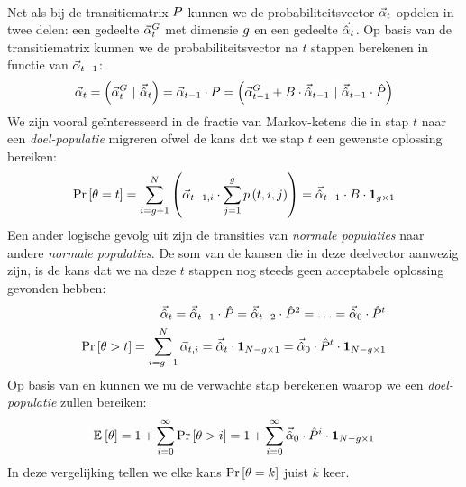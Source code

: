 \paragraph{}
Net als bij de transitiematrix $P$ kunnen we de probabiliteitsvector $\vec{\alpha}_{t}$ opdelen in twee delen: een gedeelte $\vec{\alpha}^G_{t}$ met dimensie $g$ en een gedeelte $\vec{\hat{\alpha}}_{t}$. Op basis van de transitiematrix kunnen we de probabiliteitsvector na $t$ stappen berekenen in functie van $\vec{\alpha}_{t-1}$:
\begin{equation}
\probdistmeta{t}=\brak{\probdistgoalmeta{t}\ |\ \probdistnormmeta{t}}=\probdistmeta{t-1}\cdot\transmat=\brak{\probdistgoalmeta{t-1}+\bridgemat\cdot\probdistnormmeta{t-1}\ |\ \probdistnormmeta{t-1}\cdot\removmat}
\eqnlab{oneStepTransition}
\end{equation}
We zijn vooral ge\"interesseerd in de fractie van Markov-ketens die in stap $t$ naar een \emph{doel-populatie} migreren ofwel de kans dat we stap $t$ een gewenste oplossing bereiken:
\begin{equation}
\Prob{\hittime=t}=\displaystyle\sum_{i=\ntarpop+1}^{N}\brak{\probdistmeta{t-1,i}\cdot\displaystyle\sum_{j=1}^{\ntarpop}\fun{p}{t,i,j}}=\probdistnormmeta{t-1}\cdot \bridgemat\cdot\onematrix[\ntarpop\times 1]
\eqnlab{exhaust}
\end{equation}
Een ander logische gevolg uit  zijn de transities van \emph{normale populaties} naar andere \emph{normale populaties}. De som van de kansen die in deze deelvector aanwezig zijn, is de kans dat we na deze $t$ stappen nog steeds geen acceptabele oplossing gevonden hebben:
\begin{eqnarray}
\probdistnormmeta{t}=\probdistnormmeta{t-1}\cdot\removmat=\probdistnormmeta{t-2}\cdot\removmat^2=\ldots=\probdistnormmeta{0}\cdot\removmat^t\eqnlab{remainder}\\
\Prob{\hittime>t}=\displaystyle\sum_{i=\ntarpop+1}^{\npop}\probdistmeta{t,i}=\probdistnormmeta{t}\cdot\onematrix[\npop-\ntarpop\times1]=\probdistnormmeta{0}\cdot\removmat^t\cdot\onematrix[\npop-\ntarpop\times1]\eqnlab{nothit}
\end{eqnarray}
Op basis van  en  kunnen we nu de verwachte stap berekenen waarop we een \emph{doel-populatie} zullen bereiken:
\begin{equation}
\mean{\hittime}=1+\displaystyle\sum_{i=0}^{\infty}{\Prob{\hittime>i}}=1+\displaystyle\sum_{i=0}^{\infty}{\probdistnormmeta{0}\cdot\removmat^i\cdot\onematrix[\npop-\ntarpop\times1]}
\eqnlab{meanHit}
\end{equation}
In deze vergelijking tellen we elke kans $\Pr\left[\theta=k\right]$ juist $k$ keer.
